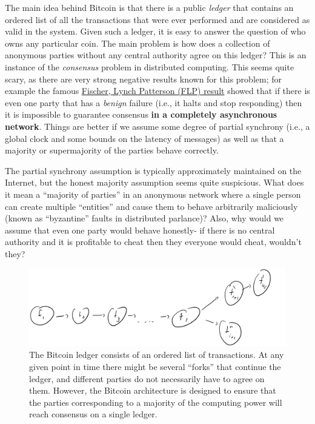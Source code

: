 The main idea behind Bitcoin is that there is a public \emph{ledger}
that contains an ordered list of all the transactions that were ever
performed and are considered as valid in the system. Given such a
ledger, it is easy to answer the question of who owns any particular
coin. The main problem is how does a collection of anonymous parties
without any central authority agree on this ledger? This is an instance
of the \emph{consensus} problem in distributed computing. This seems
quite scary, as there are very strong negative results known for this
problem; for example the famous
\href{http://the-paper-trail.org/blog/a-brief-tour-of-flp-impossibility/}{Fischer,
Lynch Patterson (FLP) result} showed that if there is even one party
that has a \emph{benign} failure (i.e., it halts and stop responding)
then it is impossible to guarantee consensus \textbf{in a completely
asynchronous network}. Things are better if we assume some degree of
partial synchrony (i.e., a global clock and some bounds on the latency
of messages) as well as that a majority or supermajority of the parties
behave correctly.

The partial synchrony assumption is typically approximately maintained
on the Internet, but the honest majority assumption seems quite
suspicious. What does it mean a ``majority of parties'' in an anonymous
network where a single person can create multiple ``entities'' and cause
them to behave arbitrarily maliciously (known as ``byzantine'' faults in
distributed parlance)? Also, why would we assume that even one party
would behave honestly- if there is no central authority and it is
profitable to cheat then they everyone would cheat, wouldn't they?


\begin{figure}
\centering
\includegraphics[width=\textwidth, height=0.25\paperheight, keepaspectratio]{../figure/Bitcoin_ledger.jpg}
\caption{The Bitcoin ledger consists of an ordered list of transactions.
At any given point in time there might be several ``forks'' that
continue the ledger, and different parties do not necessarily have to
agree on them. However, the Bitcoin architecture is designed to ensure
that the parties corresponding to a majority of the computing power will
reach consensus on a single ledger.}
\label{ledgerfig}
\end{figure}

